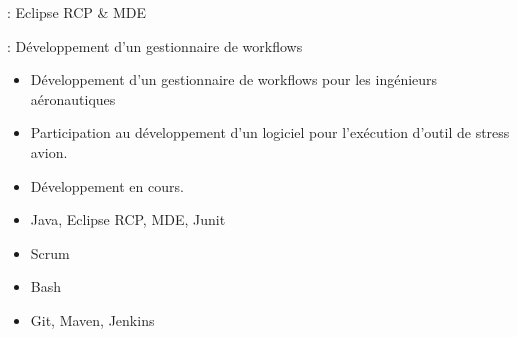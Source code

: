 

 : Eclipse RCP \& MDE

 : Développement d’un gestionnaire de workflows

\bigskip


\begin{itemize}
\item Développement d'un gestionnaire de workflows pour les ingénieurs aéronautiques
\item Participation au développement d'un logiciel pour l'exécution d'outil de stress avion.
\end{itemize} 


\begin{itemize}
\item Développement en cours. 
\end{itemize} 


\begin{itemize}
\item Java, Eclipse RCP, MDE, Junit
\item Scrum
\item Bash
\item Git, Maven, Jenkins
\end{itemize} 